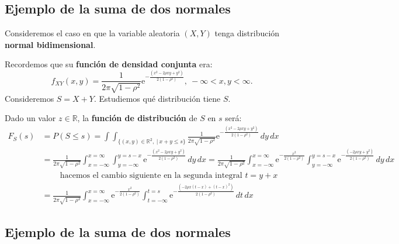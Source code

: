\documentclass[]{book}
\begin{document}
\hypertarget{ejemplo-de-la-suma-de-dos-normales}{%
\subsection{Ejemplo de la suma de dos normales}\label{ejemplo-de-la-suma-de-dos-normales}}

Consideremos el caso en que la variable aleatoria \((X,Y)\) tenga distribución \textbf{normal bidimensional}.

Recordemos que su \textbf{función de densidad conjunta} era:
\[
f_{XY}(x,y)=\frac{1}{2\pi\sqrt{1-\rho^2}}\mathrm{e}^{-\frac{(x^2-2\rho xy+y^2)}{2(1-\rho^2)}},\ -\infty <x,y<\infty.
\]
Consideremos \(S=X+Y\). Estudiemos qué distribución tiene \(S\).

Dado un valor \(z\in\mathbb{R}\), la \textbf{función de distribución} de \(S\) en \(s\) será:
\[
\begin{array}{rl}
F_S(s) & =P(S\leq s)=\int\int_{\{(x,y)\in\mathbb{R}^2,\ |\ x+y\leq s\}}\frac{1}{2\pi\sqrt{1-\rho^2}}\mathrm{e}^{-\frac{(x^2-2\rho xy+y^2)}{2(1-\rho^2)}}\, dy\, dx \\ & =
\frac{1}{2\pi\sqrt{1-\rho^2}} \int_{x=-\infty}^{x=\infty}\int_{y=-\infty}^{y=s-x}\mathrm{e}^{-\frac{(x^2-2\rho xy+y^2)}{2(1-\rho^2)}}\, dy\, dx = \frac{1}{2\pi\sqrt{1-\rho^2}} \int_{x=-\infty}^{x=\infty} \mathrm{e}^{-\frac{x^2}{2(1-\rho^2)}} \int_{y=-\infty}^{y=s-x}\mathrm{e}^{-\frac{(-2\rho xy+y^2)}{2(1-\rho^2)}}\, dy\, dx  \\ &\ \qquad\mbox{hacemos el cambio siguiente en la segunda integral $t=y+x$}\\ & = \frac{1}{2\pi\sqrt{1-\rho^2}} \int_{x=-\infty}^{x=\infty} \mathrm{e}^{-\frac{x^2}{2(1-\rho^2)}} \int_{t=-\infty}^{t=s}\mathrm{e}^{-\frac{(-2\rho x(t-x)+(t-x)^2)}{2(1-\rho^2)}}\, dt\, dx 
\end{array}
\]

\hypertarget{ejemplo-de-la-suma-de-dos-normales-1}{%
\subsection{Ejemplo de la suma de dos normales}\label{ejemplo-de-la-suma-de-dos-normales-1}}
\end{document}
